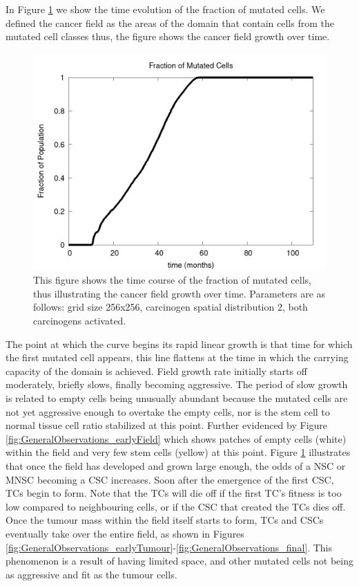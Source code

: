 \documentclass[\main/thesis.tex]{subfiles}
\begin{document}
 In Figure \ref{fig:GeneralObservations_FieldGrowth} we show the time evolution of the fraction of mutated cells. We defined the cancer field as the areas of the domain that contain cells from the mutated cell classes thus, the figure shows the cancer field growth over time. 
 \begin{figure}[H]
    \centering
    \includegraphics[scale=0.25]{images/2_GeneralObservations/Fig4/numMutated.png}
    \caption{This figure shows the time course of the fraction of mutated cells, thus illustrating the cancer field growth over time. Parameters are as follows: grid size 256x256, carcinogen spatial distribution 2, both carcinogens activated.}
    \label{fig:GeneralObservations_FieldGrowth}
\end{figure}
 The point at which the curve begins its rapid linear growth is that time for which the first mutated cell appears, this line flattens at the time in which the carrying capacity of the domain is achieved. Field growth rate initially starts off moderately, briefly slows, finally becoming aggressive. The period of slow growth is related to empty cells being unusually abundant because the mutated cells are not yet aggressive enough to overtake the empty cells, nor is the stem cell to normal tissue cell ratio stabilized at this point. Further evidenced by Figure \ref{fig:GeneralObservations_earlyField} which shows patches of empty cells (white) within the field and very few stem cells (yellow) at this point.
Figure \ref{fig:GeneralObservations_FieldGrowth} illustrates that once the field has developed and grown large enough, the odds of a NSC or MNSC becoming a CSC increases. Soon after the emergence of the first CSC, TCs begin to form. 
Note that the TCs will die off if the first TC's fitness is too low compared to neighbouring cells, or if the CSC that created the TCs dies off.
Once the tumour mass within the field itself starts to form, TCs and CSCs eventually take over the entire field, as shown in Figures \ref{fig:GeneralObservations_earlyTumour}-\ref{fig:GeneralObservations_final}. This phenomenon is a result of having limited space, and other mutated cells not being as aggressive and fit as the tumour cells. %
\end{document}

